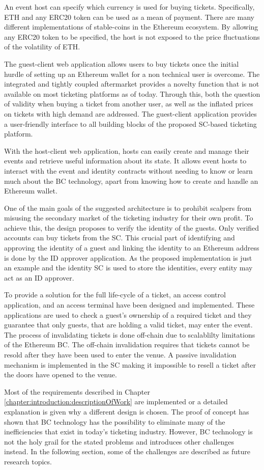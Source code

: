 An event host can specify which currency is used for buying tickets. Specifically, ETH and any ERC20 token can be used as a mean of payment. There are many different implementations of stable-coins in the Ethereum ecosystem. By allowing any ERC20 token to be specified, the host is not exposed to the price fluctuations of the volatility of ETH.

The guest-client web application allows users to buy tickets once the initial hurdle of setting up an Ethereum wallet for a non technical user is overcome. The integrated and tightly coupled aftermarket provides a novelty function that is not available on most ticketing platforms as of today. Through this, both the question of validity when buying a ticket from another user, as well as the inflated prices on tickets with high demand are addressed. The guest-client application provides a user-friendly interface to all building blocks of the proposed SC-based ticketing platform.

With the host-client web application, hosts can easily create and manage their events and retrieve useful information about its state. It allows event hosts to interact with the event and identity contracts without needing to know or learn much about the BC technology, apart from knowing how to create and handle an Ethereum wallet.

One of the main goals of the suggested architecture is to prohibit scalpers from misusing the secondary market of the ticketing industry for their own profit. To achieve this, the design proposes to verify the identity of the guests. Only verified accounts can buy tickets from the SC. This crucial part of identifying and approving the identity of a guest and linking the identity to an Ethereum address is done by the ID approver application. As the proposed implementation is just an example and the identity SC is used to store the identities, every entity may act as an ID approver.

To provide a solution for the full life-cycle of a ticket, an access control application, and an access terminal have been designed and implemented. These applications are used to check a guest's ownership of a required ticket and they guarantee that only guests, that are holding a valid ticket, may enter the event. The process of invalidating tickets is done off-chain due to scalablilty limitations of the Ethereum BC. The off-chain invalidation requires that tickets cannot be resold after they have been used to enter the venue. A passive invalidation mechanism is implemented in the SC making it impossible to resell a ticket after the doors have opened to the venue. 

Most of the requirements described in Chapter \ref{chapter:introduction:descriptionOfWork} are implemented or a detailed explanation is given why a different design is chosen. The proof of concept has shown that BC technology has the possibility to eliminate many of the inefficiencies that exist in today's ticketing industry. However, BC technology is not the holy grail for the stated problems and introduces other challenges instead. In the following section, some of the challenges are described as future research topics. 

